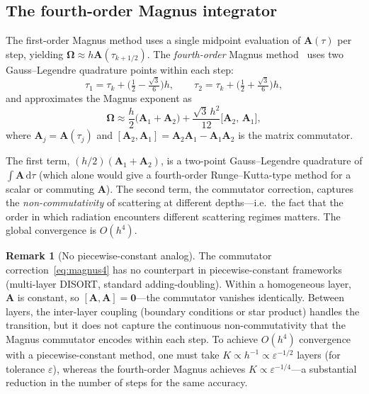 \documentclass[11pt,a4paper]{article}
\newcommand{\mat}[1]{\mathbf{#1}}
\newcommand{\dd}{\,\mathrm{d}}
\theoremstyle{definition}
\newtheorem{remark}{Remark}
\begin{document}
\subsection{The fourth-order Magnus integrator}\label{sec:magnus4}

The first-order Magnus method uses a single midpoint evaluation of
$\mat{A}(\tau)$ per step, yielding
$\mat{\Omega}\approx h\mat{A}(\tau_{k+1/2})$.
The \emph{fourth-order} Magnus method~\cite{blanes2009,iserles2000}
uses two Gauss--Legendre quadrature points within each step:
\begin{equation}\label{eq:GL_points}
  \tau_1 = \tau_k + \bigl(\tfrac{1}{2}-\tfrac{\sqrt{3}}{6}\bigr)h,
  \qquad
  \tau_2 = \tau_k + \bigl(\tfrac{1}{2}+\tfrac{\sqrt{3}}{6}\bigr)h,
\end{equation}
and approximates the Magnus exponent as
\begin{equation}\label{eq:magnus4}
  \mat{\Omega} \approx \frac{h}{2}\bigl(\mat{A}_1+\mat{A}_2\bigr)
  + \frac{\sqrt{3}\,h^2}{12}\bigl[\mat{A}_2,\,\mat{A}_1\bigr],
\end{equation}
where $\mat{A}_j=\mat{A}(\tau_j)$ and $[\mat{A}_2,\mat{A}_1]=
\mat{A}_2\mat{A}_1-\mat{A}_1\mat{A}_2$ is the matrix commutator.

The first term, $(h/2)(\mat{A}_1+\mat{A}_2)$, is a two-point
Gauss--Legendre quadrature of $\int\mat{A}\dd\tau$ (which alone would
give a fourth-order Runge--Kutta-type method for a scalar or commuting
$\mat{A}$).  The second term, the commutator correction, captures the
\emph{non-commutativity} of scattering at different depths---i.e.\ the
fact that the order in which radiation encounters different scattering
regimes matters.  The global convergence is $O(h^4)$.

\begin{remark}[No piecewise-constant analog]
The commutator correction~\eqref{eq:magnus4} has no counterpart in
piecewise-constant frameworks (multi-layer DISORT, standard
adding-doubling).  Within a homogeneous layer, $\mat{A}$ is constant,
so $[\mat{A},\mat{A}]=\mat{0}$---the commutator vanishes identically.
Between layers, the inter-layer coupling (boundary conditions or star
product) handles the transition, but it does not capture the continuous
non-commutativity that the Magnus commutator encodes within each step.
To achieve $O(h^4)$ convergence with a piecewise-constant method, one
must take $K\propto h^{-1}\propto\varepsilon^{-1/2}$ layers (for
tolerance $\varepsilon$), whereas the fourth-order Magnus achieves
$K\propto\varepsilon^{-1/4}$---a substantial reduction in the number
of steps for the same accuracy.
\end{remark}
\end{document}

